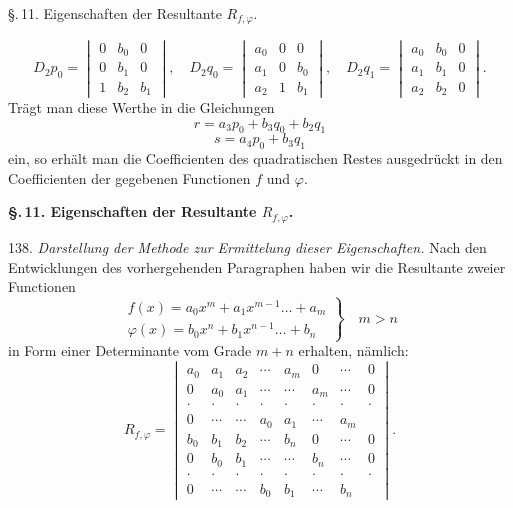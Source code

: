 
\begin{center}
\S.\,11. Eigenschaften der Resultante $R_{f,\varphi}$.
\end{center}

\[
D_2p_0 =
\begin{vmatrix}
0 & b_0 & 0 \\
0 & b_1 & 0 \\
1 & b_2 & b_1
\end{vmatrix}, \quad
D_2q_0 =
\begin{vmatrix}
a_0 & 0 & 0 \\
a_1 & 0 & b_0 \\
a_2 & 1 & b_1
\end{vmatrix}, \quad
D_2q_1 =
\begin{vmatrix}
a_0 & b_0 & 0 \\
a_1 & b_1 & 0 \\
a_2 & b_2 & 0
\end{vmatrix}.
\]
Trägt man diese Werthe in die Gleichungen
\[
r = a_3p_0+b_3q_0+b_2q_1
\]
\[
s = a_4p_0+b_3q_1
\]
ein, so erhält man die Coefficienten des quadratischen Restes ausgedrückt in den Coefficienten der gegebenen Functionen $f$ und $\varphi$.

\begin{center}
\textbf{\S.\,11. Eigenschaften der Resultante $R_{f,\varphi}$.}
\end{center}

138. \textit{Darstellung der Methode zur Ermittelung dieser Eigenschaften.} Nach den Entwicklungen des vorhergehenden Paragraphen haben wir die Resultante zweier Functionen
\[
\left.
\begin{array}{l}
f(x) = a_0x^m+a_1x^{m-1}\ldots+a_m \\
\varphi(x) = b_0x^n+b_1x^{n-1}\ldots+b_n
\end{array}
\right\} \quad m>n
\]
in Form einer Determinante vom Grade $m+n$ erhalten, nämlich:
\[
R_{f,\varphi} =
\begin{vmatrix}
a_0 & a_1 & a_2 & \cdots & a_m & 0 & \cdots & 0 \\
0 & a_0 & a_1 & \cdots & \cdots & a_m & \cdots & 0 \\
\cdot & \cdot & \cdot & \cdot & \cdot & \cdot & \cdot & \cdot \\
0 & \cdots & \cdots & a_0 & a_1 & \cdots & a_m & {} \\
b_0 & b_1 & b_2 & \cdots & b_n & 0 & \cdots & 0 \\
0 & b_0 & b_1 & \cdots & \cdots & b_n & \cdots & 0 \\
\cdot & \cdot & \cdot & \cdot & \cdot & \cdot & \cdot & \cdot \\
0 & \cdots & \cdots & b_0 & b_1 & \cdots & b_n & {}
\end{vmatrix}.
\]

